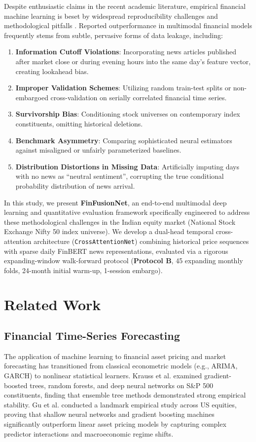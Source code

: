\documentclass[10pt,journal,compsoc,twocolumn]{IEEEtran}
\begin{document}
Despite enthusiastic claims in the recent academic literature, empirical financial machine learning is beset by widespread reproducibility challenges and methodological pitfalls \cite{lopezdeprado2018advances}. Reported outperformance in multimodal financial models frequently stems from subtle, pervasive forms of data leakage, including:
\begin{enumerate}
    \item \textbf{Information Cutoff Violations}: Incorporating news articles published after market close or during evening hours into the same day's feature vector, creating lookahead bias.
    \item \textbf{Improper Validation Schemes}: Utilizing random train-test splits or non-embargoed cross-validation on serially correlated financial time series.
    \item \textbf{Survivorship Bias}: Conditioning stock universes on contemporary index constituents, omitting historical deletions.
    \item \textbf{Benchmark Asymmetry}: Comparing sophisticated neural estimators against misaligned or unfairly parameterized baselines.
    \item \textbf{Distribution Distortions in Missing Data}: Artificially imputing days with no news as ``neutral sentiment'', corrupting the true conditional probability distribution of news arrival.
\end{enumerate}

In this study, we present \textbf{FinFusionNet}, an end-to-end multimodal deep learning and quantitative evaluation framework specifically engineered to address these methodological challenges in the Indian equity market (National Stock Exchange Nifty 50 index universe). We develop a dual-head temporal cross-attention architecture (\texttt{CrossAttentionNet}) combining historical price sequences with sparse daily FinBERT news representations, evaluated via a rigorous expanding-window walk-forward protocol (\textbf{Protocol B}, 45 expanding monthly folds, 24-month initial warm-up, 1-session embargo).

\section{Related Work}
\subsection{Financial Time-Series Forecasting}
The application of machine learning to financial asset pricing and market forecasting has transitioned from classical econometric models (e.g., ARIMA, GARCH) to nonlinear statistical learners. Krauss et al. \cite{krauss2017deep} examined gradient-boosted trees, random forests, and deep neural networks on S\&P 500 constituents, finding that ensemble tree methods demonstrated strong empirical stability. Gu et al. \cite{gu2020empirical} conducted a landmark empirical study across US equities, proving that shallow neural networks and gradient boosting machines \cite{chen2016xgboost, friedman2001greedy} significantly outperform linear asset pricing models by capturing complex predictor interactions and macroeconomic regime shifts.
\end{document}
